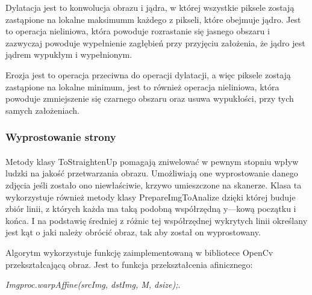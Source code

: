 \documentclass[a4paper,12pt]{article}
\begin{document}
		        Dylatacja jest to konwolucja obrazu i jądra, w której wszystkie piksele zostają zastąpione na lokalne maksimumm każdego z pikseli, które obejmuje jądro. Jest to operacja nieliniowa, która powoduje rozrastanie się jasnego obszaru i zazwyczaj powoduje wypełnienie zagłębień przy przyjęciu założenia, że jądro jest jądrem wypukłym i wypełnionym. \par
    		    Erozja jest to operacja przeciwna do operacji dylatacji, a więc piksele zostają zastąpione na lokalne minimum, jest to również operacja nieliniowa, która powoduje zmniejszenie się czarnego obszaru oraz usuwa wypukłości, przy tych samych założeniach.
		    
		\subsubsection{Wyprostowanie strony}		
		    \paragraph{\indent} 
		    Metody klasy ToStraightenUp pomagają zniwelować w pewnym stopniu wpływ      ludzki na jakość przetwarzania obrazu. Umożliwiają one wyprostowanie        danego zdjęcia jeśli zostało ono niewłaściwie, krzywo umieszczone na      skanerze. Klasa ta wykorzystuje również metody klasy PrepareImgToAnalize     dzięki której buduje zbiór linii, z których każda ma taką podobną           współrzędną y---kową początku i końca. I na podstawię średniej z różnic     tej współrzędnej wykrytych linii określany jest kąt o jaki należy        obrócić obraz, tak aby został on wyprostowany.  
		
		        Algorytm wykorzystuje funkcję zaimplementowaną w bibliotece OpenCv przekształcającą obraz. Jest to funkcja przekształcenia afinicznego:
    		    \begin{center}
    		        \textit{Imgproc.warpAffine(srcImg, dstImg, M, dsize);}.
    		    \end{center}
		    
\end{document}
